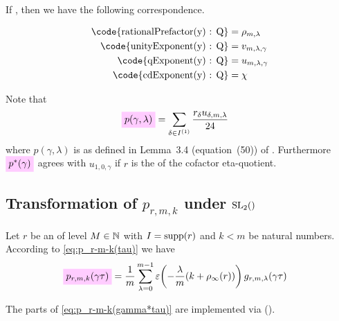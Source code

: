 \documentclass{article}
\begin{document}
If , then we have the
following correspondence.

\begin{align*}
  \text{\code{rationalPrefactor(y) : Q}}
  &=
    \rho_{m,\lambda}
  \\
  \text{\code{unityExponent(y) : Q}}
  &=
    v_{m,\lambda,\gamma}
  \\
  \text{\code{qExponent(y) : Q}}
  &=
    u_{m,\lambda,\gamma}
  \\
  \text{\code{cdExponent(y) : Q}}
  &=
    \chi
\end{align*}


Note that
\begin{align}
  \defineNotation[p-gamma-lambda]{p(\gamma,\lambda)}
  &=
    \sum_{\delta \in I^{(1)}} \frac{r_\delta u_{\delta,m,\lambda}}{24}
  \label{eq:p_gamma-lambda}
\end{align}
where $p(\gamma,\lambda)$ is as defined in Lemma~3.4 (equation~(50))
of \cite{Radu_AlgorithmicApproachRamanujanCongruences_2009}.
Furthermore $\defineNotation[p-star-gamma-lambda]{p^*(\gamma)}$ agrees
with $u_{1,0,\gamma}$ if $r$ is the  of the
cofactor eta-quotient.










\subsection{Transformation of $p_{r,m,k}$ under $\SL2Z$}

Let $r$ be an  of level $M\in\mathbb{N}$ with
$I=\operatorname{supp}(r)$ and $k < m$ be natural numbers.
%
According to \eqref{eq:p_r-m-k(tau)} we have
\begin{align}
  \defineNotation[p-r-m-k-gamma-tau]{p_{r,m,k}(\gamma\tau)}
  &=
    \frac{1}{m} \sum_{\lambda=0}^{m-1}
    \unityPower{-\frac{\lambda}{m} (k+\rho_\infty(r))}
    g_{r,m,\lambda}(\gamma\tau)
      \label{eq:p_r-m-k(gamma*tau)}
\end{align}




The parts of \eqref{eq:p_r-m-k(gamma*tau)} are implemented via
\textcolor{blue}{}
().
\end{document}
